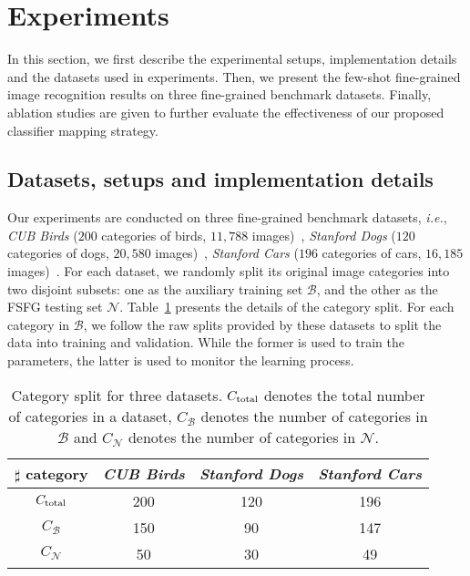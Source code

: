 \documentclass[10pt,twocolumn,letterpaper]{article}
\begin{document}
\section{Experiments}\label{sec:experiment}

In this section, we first describe the experimental setups, implementation details and the datasets used in experiments. Then, we present the few-shot fine-grained image recognition results on three fine-grained benchmark datasets. Finally, ablation studies are given to further evaluate the effectiveness of our proposed classifier mapping strategy.

\subsection{Datasets, setups and implementation details}\label{sec:setting}

Our experiments are conducted on three fine-grained benchmark datasets, \emph{i.e.}, \emph{CUB Birds} ($200$ categories of birds, $11,788$ images)~\cite{WahCUB200_2011}, \emph{Stanford Dogs} ($120$ categories of dogs, $20,580$ images)~\cite{Khosla11stanforddogs}, \emph{Stanford Cars} ($196$ categories of cars, $16,185$ images)~\cite{cars}. For each dataset, we randomly split its original image categories into two disjoint subsets: one as the auxiliary training set $\mathcal{B}$, and the other as the FSFG testing set $\mathcal{N}$. Table~\ref{table:dataset} presents the details of the category split. For each category in $\mathcal{B}$, we follow the raw splits provided by these datasets to split the data into training and validation. While the former is used to train the parameters, the latter is used to monitor the learning process. 

\begin{table}[t]
 \caption{Category split for three datasets. ${C}_{\rm total}$ denotes the total number of categories in a dataset, $C_{\mathcal{B}}$ denotes the number of categories in $\mathcal{B}$  and $C_{\mathcal{N}}$ denotes the number of categories in $\mathcal{N}$.} \label{table:dataset}
 \centering
 \small
 \begin{tabular}{|c|c|c|c|}
  \hline
	$\sharp$ category & \emph{CUB Birds} & \emph{Stanford Dogs} & \emph{Stanford Cars} \\
  \hline
  \hline
	$C_{\rm total}$ & 200 & 120 & 196 \\
	$C_{\mathcal{B}}$ & 150 & 90 & 147 \\
	$C_{\mathcal{N}}$ & 50 & 30 & 49 \\
  \hline
 \end{tabular}
\end{table}
\end{document}
